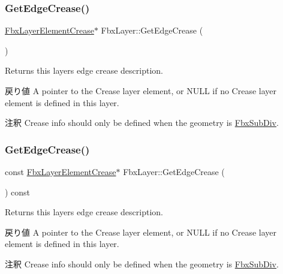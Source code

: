 \subsubsection{\texorpdfstring{Get\+Edge\+Crease()}{GetEdgeCrease()}\hspace{0.1cm}{\footnotesize\ttfamily [1/2]}}
{\footnotesize\ttfamily \hyperlink{class_fbx_layer_element_crease}{Fbx\+Layer\+Element\+Crease}$\ast$ Fbx\+Layer\+::\+Get\+Edge\+Crease (\begin{DoxyParamCaption}{ }\end{DoxyParamCaption})}

Returns this layer\textquotesingle{}s edge crease description. \begin{DoxyReturn}{戻り値}
A pointer to the Crease layer element, or {\ttfamily N\+U\+LL} if no Crease layer element is defined in this layer. 
\end{DoxyReturn}
\begin{DoxyRemark}{注釈}
Crease info should only be defined when the geometry is \hyperlink{class_fbx_sub_div}{Fbx\+Sub\+Div}. 
\end{DoxyRemark}
\mbox{\label{class_fbx_layer_a5211f03112abb24355d0c97c158a0336}} 
\subsubsection{\texorpdfstring{Get\+Edge\+Crease()}{GetEdgeCrease()}\hspace{0.1cm}{\footnotesize\ttfamily [2/2]}}
{\footnotesize\ttfamily const \hyperlink{class_fbx_layer_element_crease}{Fbx\+Layer\+Element\+Crease}$\ast$ Fbx\+Layer\+::\+Get\+Edge\+Crease (\begin{DoxyParamCaption}{ }\end{DoxyParamCaption}) const}

Returns this layer\textquotesingle{}s edge crease description. \begin{DoxyReturn}{戻り値}
A pointer to the Crease layer element, or {\ttfamily N\+U\+LL} if no Crease layer element is defined in this layer. 
\end{DoxyReturn}
\begin{DoxyRemark}{注釈}
Crease info should only be defined when the geometry is \hyperlink{class_fbx_sub_div}{Fbx\+Sub\+Div}. 
\end{DoxyRemark}
\mbox{\label{class_fbx_layer_aebe867dbfd267aeb3de587c0d87d1208}} 
